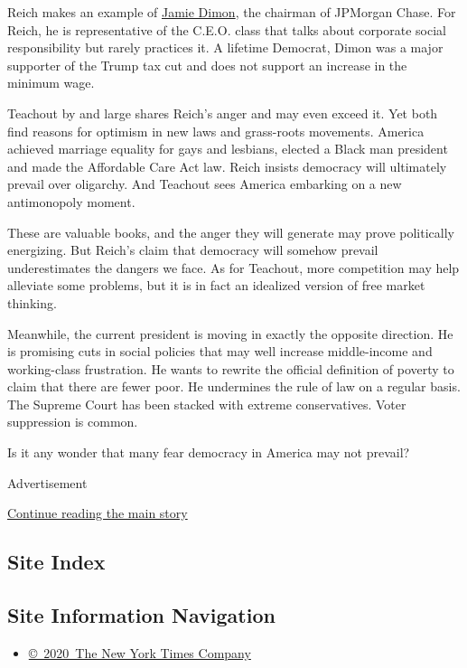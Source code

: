 Reich makes an example of
\href{https://institute.jpmorganchase.com/about/our-leadership/jamie-dimon}{Jamie
Dimon}, the chairman of JPMorgan Chase. For Reich, he is representative
of the C.E.O. class that talks about corporate social responsibility but
rarely practices it. A lifetime Democrat, Dimon was a major supporter of
the Trump tax cut and does not support an increase in the minimum wage.

Teachout by and large shares Reich's anger and may even exceed it. Yet
both find reasons for optimism in new laws and grass-roots movements.
America achieved marriage equality for gays and lesbians, elected a
Black man president and made the Affordable Care Act law. Reich insists
democracy will ultimately prevail over oligarchy. And Teachout sees
America embarking on a new antimonopoly moment.

These are valuable books, and the anger they will generate may prove
politically energizing. But Reich's claim that democracy will somehow
prevail underestimates the dangers we face. As for Teachout, more
competition may help alleviate some problems, but it is in fact an
idealized version of free market thinking.

Meanwhile, the current president is moving in exactly the opposite
direction. He is promising cuts in social policies that may well
increase middle-income and working-class frustration. He wants to
rewrite the official definition of poverty to claim that there are fewer
poor. He undermines the rule of law on a regular basis. The Supreme
Court has been stacked with extreme conservatives. Voter suppression is
common.

Is it any wonder that many fear democracy in America may not prevail?

Advertisement

\protect\hyperlink{after-bottom}{Continue reading the main story}

\hypertarget{site-index}{%
\subsection{Site Index}\label{site-index}}

\hypertarget{site-information-navigation}{%
\subsection{Site Information
Navigation}\label{site-information-navigation}}

\begin{itemize}
\tightlist
\item
  \href{https://help.nytimes.com/hc/en-us/articles/115014792127-Copyright-notice}{©~2020~The
  New York Times Company}
\end{itemize}

